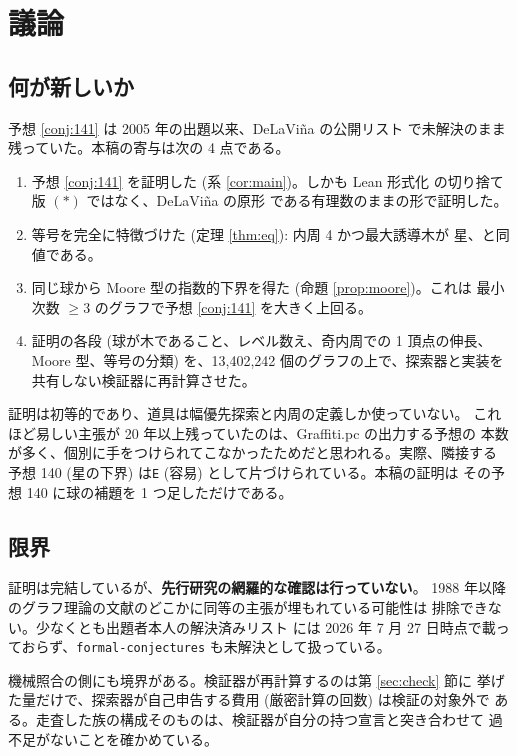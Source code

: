 \documentclass[paper=a4,fontsize=10.5pt,jafontsize=10.5pt]{jlreq}
\theoremstyle{plain}
\theoremstyle{definition}
\begin{document}
\section{議論}\label{sec:disc}

\subsection*{何が新しいか}

予想 \ref{conj:141} は 2005 年の出題以来、DeLaViña の公開リスト
\cite{wowii} で未解決のまま残っていた。本稿の寄与は次の 4 点である。

\begin{enumerate}
\item 予想 \ref{conj:141} を証明した (系 \ref{cor:main})。しかも Lean
  形式化 \cite{formalconj} の切り捨て版 $(\ast)$ ではなく、DeLaViña の原形
  である有理数のままの形で証明した。
\item 等号を完全に特徴づけた (定理 \ref{thm:eq}): 内周 4 かつ最大誘導木が
  星、と同値である。
\item 同じ球から Moore 型の指数的下界を得た (命題 \ref{prop:moore})。これは
  最小次数 $\ge 3$ のグラフで予想 \ref{conj:141} を大きく上回る。
\item 証明の各段 (球が木であること、レベル数え、奇内周での 1 頂点の伸長、
  Moore 型、等号の分類) を、13,402,242 個のグラフの上で、探索器と実装を
  共有しない検証器に再計算させた。
\end{enumerate}

証明は初等的であり、道具は幅優先探索と内周の定義しか使っていない。
これほど易しい主張が 20 年以上残っていたのは、Graffiti.pc の出力する予想の
本数が多く、個別に手をつけられてこなかったためだと思われる。実際、隣接する
予想 140 (星の下界) は\texttt{E} (容易) として片づけられている。本稿の証明は
その予想 140 に球の補題を 1 つ足しただけである。

\subsection*{限界}

証明は完結しているが、\textbf{先行研究の網羅的な確認は行っていない}。
1988 年以降のグラフ理論の文献のどこかに同等の主張が埋もれている可能性は
排除できない。少なくとも出題者本人の解決済みリスト \cite{wowii} には
2026 年 7 月 27 日時点で載っておらず、\texttt{formal-conjectures}
\cite{formalconj} も未解決として扱っている。

機械照合の側にも境界がある。検証器が再計算するのは第 \ref{sec:check} 節に
挙げた量だけで、探索器が自己申告する費用 (厳密計算の回数) は検証の対象外で
ある。走査した族の構成そのものは、検証器が自分の持つ宣言と突き合わせて
過不足がないことを確かめている。
\end{document}
